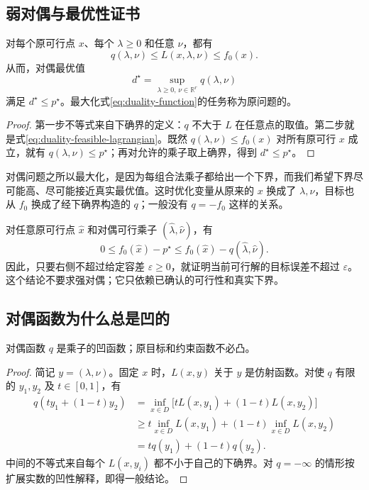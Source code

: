 \documentclass[UTF8]{ctexart}
\begin{document}
\subsection{弱对偶与最优性证书}

\begin{theorem}[弱对偶]
\label{thm:duality-weak}
对每个原可行点 $x$、每个 $\lambda\geq0$ 和任意 $\nu$，都有
\begin{equation}
 q(\lambda,\nu)\leq L(x,\lambda,\nu)\leq f_0(x).
 \label{eq:duality-bound-chain}
\end{equation}
从而，对偶最优值
\begin{equation}
 d^\star=\sup_{\lambda\geq0,\,\nu\in\mathbb R^r}q(\lambda,\nu)
 \label{eq:duality-dual-problem}
\end{equation}
满足 $d^\star\leq p^\star$。最大化式\eqref{eq:duality-function}的任务称为原问题的。
\end{theorem}
\begin{proof}
第一步不等式来自下确界的定义：$q$ 不大于 $L$ 在任意点的取值。第二步就是式\eqref{eq:duality-feasible-lagrangian}。既然 $q(\lambda,\nu)\leq f_0(x)$ 对所有原可行 $x$ 成立，就有 $q(\lambda,\nu)\leq p^\star$；再对允许的乘子取上确界，得到 $d^\star\leq p^\star$。
\end{proof}

对偶问题之所以最大化，是因为每组合法乘子都给出一个下界，而我们希望下界尽可能高、尽可能接近真实最优值。这时优化变量从原来的 $x$ 换成了 $\lambda,\nu$，目标也从 $f_0$ 换成了经下确界构造的 $q$；一般没有 $q=-f_0$ 这样的关系。

对任意原可行点 $\widehat x$ 和对偶可行乘子 $(\widehat\lambda,\widehat\nu)$，有
\begin{equation}
 0\leq f_0(\widehat x)-p^\star
 \leq f_0(\widehat x)-q(\widehat\lambda,\widehat\nu).
 \label{eq:duality-certificate}
\end{equation}
因此，只要右侧不超过给定容差 $\varepsilon\geq0$，就证明当前可行解的目标误差不超过 $\varepsilon$。这个结论不要求强对偶；它只依赖已确认的可行性和真实下界。

\subsection{对偶函数为什么总是凹的}

\begin{proposition}
对偶函数 $q$ 是乘子的凹函数；原目标和约束函数不必凸。
\end{proposition}
\begin{proof}
简记 $y=(\lambda,\nu)$。固定 $x$ 时，$L(x,y)$ 关于 $y$ 是仿射函数。对使 $q$ 有限的 $y_1,y_2$ 及 $t\in[0,1]$，有
\begin{align*}
 q(ty_1+(1-t)y_2)
 &=\inf_{x\in D}\bigl[tL(x,y_1)+(1-t)L(x,y_2)\bigr]\\
 &\geq t\inf_{x\in D}L(x,y_1)+(1-t)\inf_{x\in D}L(x,y_2)\\
 &=tq(y_1)+(1-t)q(y_2).
\end{align*}
中间的不等式来自每个 $L(x,y_i)$ 都不小于自己的下确界。对 $q=-\infty$ 的情形按扩展实数的凹性解释，即得一般结论。
\end{proof}
\end{document}
